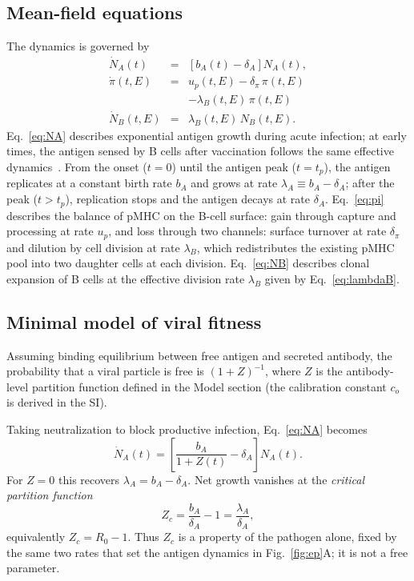 \documentclass[aps, pre, twocolumn, 10pt, groupedaddress, superscriptaddress, linenumbers]{revtex4-2}
\newcommand{\EQ}{\begin{equation}}
\newcommand{\EE}{\end{equation}}
\newcommand{\EQA}{\begin{eqnarray}}
\newcommand{\EEA}{\end{eqnarray}}
\newcommand{\DG}{E}
\newcommand{\lam}{\lambda}
\begin{document}
\subsection*{Mean-field equations}
The dynamics is governed by
\EQA
\dot N_A(t) &=& \left[b_A(t) - \delta_A\right] N_A(t), \label{eq:NA}\\
\dot \pi(t, \DG) &=& u_p(t, \DG) - \delta_\pi \,\pi(t, \DG)\nonumber\\
&& - \lam_B(t, \DG)\,\pi(t, \DG)  \label{eq:pi}\\
\dot N_B(t, \DG) &=& \lam_B(t, \DG)\, N_B(t, \DG). \label{eq:NB}
\EEA
Eq.~\ref{eq:NA} describes exponential antigen growth during acute infection; at early times, the antigen sensed by B cells after vaccination follows the same effective dynamics~\cite{MoranTovar_2024_Primary}.
From the onset ($t=0$) until the antigen peak ($t=t_p$), the antigen replicates at a constant birth rate $b_A$ and grows at rate $\lam_A \equiv b_A - \delta_A$; after the peak ($t>t_p$), replication stops and the antigen decays at rate $\delta_A$.
Eq.~\ref{eq:pi} describes the balance of pMHC on the B-cell surface: gain through capture and processing at rate $u_p$, and loss through two channels: surface turnover at rate $\delta_\pi$ and dilution by cell division at rate $\lam_B$, which redistributes the existing pMHC pool into two daughter cells at each division.
Eq.~\ref{eq:NB} describes clonal expansion of B cells at the effective division rate $\lam_B$ given by Eq.~\ref{eq:lambdaB}.

\subsection*{Minimal model of viral fitness}
Assuming binding equilibrium between free antigen and secreted antibody, the probability that a viral particle is free is $(1+Z)^{-1}$, where $Z$ is the antibody-level partition function defined in the Model section (the calibration constant $c_o$ is derived in the SI).

Taking neutralization to block productive infection,
Eq.~\ref{eq:NA} becomes
\EQ
\dot N_A(t) = \left[\frac{b_A}{1 + Z(t)} - \delta_A\right] N_A(t) .
\label{eq:NA_coupled}
\EE
For $Z = 0$ this recovers $\lam_A = b_A - \delta_A$. Net growth vanishes at
the \emph{critical partition function}
\EQ
Z_c = \frac{b_A}{\delta_A} - 1 = \frac{\lam_A}{\delta_A} ,
\label{eq:Zc}
\EE
equivalently $Z_c = R_0 - 1$. Thus $Z_c$ is a property of the pathogen alone,
fixed by the same two rates that set the antigen dynamics in
Fig.~\ref{fig:ep}A; it is not a free parameter.
\end{document}
